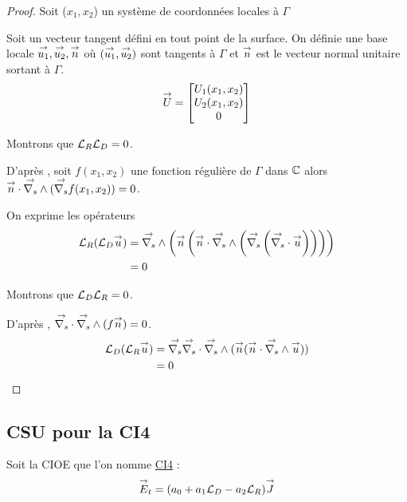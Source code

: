   \begin{proof}
    Soit (\(x_1,x_2\)) un système de coordonnées locales à \(\Gamma\)

    Soit un vecteur tangent défini en tout point de la surface. On définie une base locale \(\vect{u_1},\vect{u_2},\vect{n}\) où \((\vect{u_1},\vect{u_2})\) sont tangents à \(\Gamma\) et \(\vn\) est le vecteur normal unitaire sortant à \(\Gamma\).
    \[
      \vect{U} = 
      \begin{bmatrix}
        U_1(x_1,x_2)
        \\
        U_2(x_1,x_2)
        \\
        0
      \end{bmatrix}
    \]


    Montrons que \(\LR\LD = 0\).

    D’après \cite[p.~1029, A3.42]{bladel_electromagnetic_2007}, soit \(f(x_1,x_2)\) une fonction régulière de \(\Gamma\) dans \(\CC\) alors \(\vn \cdot \vrots(\vgrads f(x_1,x_2)) = 0\).

    On exprime les opérateurs
    \begin{align*}
      \LR(\LD \vu)  &= \vrots \left(\vn \left(\vn \cdot \vrots \left( \vgrads \left(\vdivs \vu\right)\right)\right)\right) \\
      &= 0
    \end{align*}

    Montrons que \(\LD\LR = 0\).

    D’après \cite[p.~1029, A3.43]{bladel_electromagnetic_2007}, \(\vdivs \vrots (f\vn) = 0\).
    \begin{align*}
      \LD(\LR \vu) &= \vgrads \vdivs \vrots (\vn (\vn \cdot \vrots \vu)) \\
      &= 0
    \end{align*}
  \end{proof}

\subsection{CSU pour la CI4}
  Soit la CIOE que l'on nomme \hyperlink{ci4}{CI4} :
  \begin{equation}
    \label{eq:unicite:ci4:ci4}
    \vE_t = (a_0 + a_1 \LD - a_2 \LR ) \vJ
  \end{equation}


